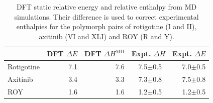 \begin{table}[h]

\caption{\label{tab:pharma_expt_deltaH}DFT static relative energy and relative enthalpy from MD simulations. Their difference is used to correct experimental enthalpies for the polymorph pairs of rotigotine (I and II), axitinib (VI and XLI) and ROY (R and Y).}
\begin{tabular}{lrrrr}
\toprule
 & DFT $\Delta E$ & DFT $\Delta H^\text{MD}$ & Expt. $\Delta H$ & Expt. $\Delta E$ \\ 
\midrule
Rotigotine & 7.1 & 7.6 & 7.5$\pm$0.5~\cite{mortazaviComputationalPolymorphScreening2019} & 7.0$\pm$0.5 \\
Axitinib & 3.4 & 3.3 & 7.3$\pm$0.8~\cite{campetaDevelopmentTargetedPolymorph2010a} & 7.5$\pm$0.8 \\
ROY & 1.6 & 1.6 & 1.2$\pm$0.5~\cite{yuPolymorphismMolecularSolids2010b} & 1.2$\pm$0.5 \\
\bottomrule
\end{tabular}

\end{table}